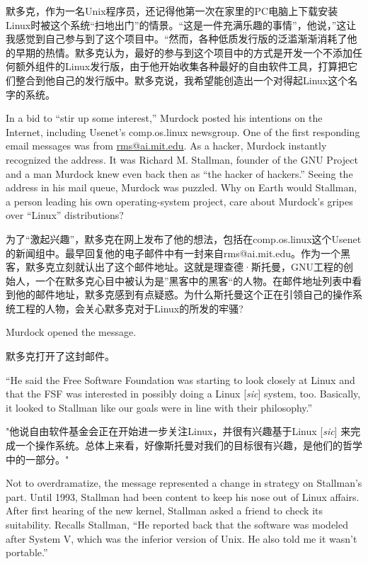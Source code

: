 \ifdefined\chs
默多克，作为一名Unix程序员，还记得他第一次在家里的PC电脑上下载安装Linux时被这个系统``扫地出门''的情景。``这是一件充满乐趣的事情''，他说，''这让我感觉到自己参与到了这个项目中。``然而，各种低质发行版的泛滥渐渐消耗了他的早期的热情。默多克认为，最好的参与到这个项目中的方式是开发一个不添加任何额外组件的Linux发行版，由于他开始收集各种最好的自由软件工具，打算把它们整合到他自己的发行版中。默多克说，我希望能创造出一个对得起Linux这个名字的系统。
\fi

\ifdefined\eng
In a bid to ``stir up some interest,'' Murdock posted his intentions on the Internet, including Usenet's comp.os.linux newsgroup. One of the first responding email messages was from \url{rms@ai.mit.edu}. As a hacker, Murdock instantly recognized the address. It was Richard M. Stallman, founder of the GNU Project and a man Murdock knew even back then as ``the hacker of hackers.'' Seeing the address in his mail queue, Murdock was puzzled. Why on Earth would Stallman, a person leading his own operating-system project, care about Murdock's gripes over ``Linux'' distributions?
\fi

\ifdefined\chs
为了``激起兴趣''，默多克在网上发布了他的想法，包括在comp.os.linux这个Usenet的新闻组中。最早回复他的电子邮件中有一封来自rms@ai.mit.edu。作为一个黑客，默多克立刻就认出了这个邮件地址。这就是理查德·斯托曼，GNU工程的创始人，一个在默多克心目中被认为是''黑客中的黑客``的人物。在邮件地址列表中看到他的邮件地址，默多克感到有点疑惑。为什么斯托曼这个正在引领自己的操作系统工程的人物，会关心默多克对于Linux的所发的牢骚?
\fi

\ifdefined\eng
Murdock opened the message.
\fi

\ifdefined\chs
默多克打开了这封邮件。
\fi

\ifdefined\eng
``He said the Free Software Foundation was starting to look closely at Linux and that the FSF was interested in possibly doing a Linux [\textit{sic}] system, too. Basically, it looked to Stallman like our goals were in line with their philosophy.''
\fi

\ifdefined\chs
"他说自由软件基金会正在开始进一步关注Linux，并很有兴趣基于Linux [\textit{sic}] 来完成一个操作系统。总体上来看，好像斯托曼对我们的目标很有兴趣，是他们的哲学中的一部分。"
\fi

\ifdefined\eng
Not to overdramatize, the message represented a change in strategy on Stallman's part. Until 1993, Stallman had been content to keep his nose out of Linux affairs. After first hearing of the new kernel, Stallman asked a friend to check its suitability. Recalls Stallman, ``He reported back that the software was modeled after System V, which was the inferior version of Unix. He also told me it wasn't portable.''
\fi

